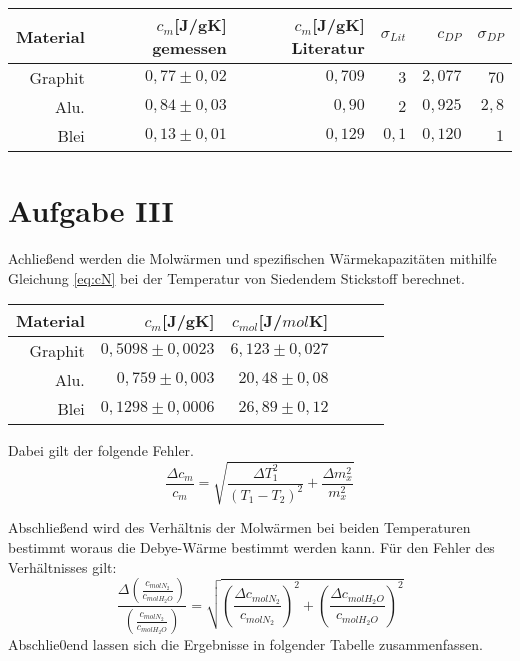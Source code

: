 \begin{table}[h!]
    \centering
    \begin{tabular}{r r r r r r}
        \toprule
        Material & $c_m$[J/gK] gemessen & $c_m$[J/gK] Literatur& $\sigma_{Lit}$ & $c_{DP}$ & $\sigma_{DP}$ \\
        \midrule
        Graphit &  $0,77 \pm 0,02 $ & $0,709$& $3$&$2,077$ &$70$\\
        Alu. & $0,84 \pm 0,03$ &$0,90$&$2$ &$0,925$ &$ 2,8 $\\
        Blei  & $0,13 \pm 0,01$ &$0,129$& $0,1$ &$0,120$&$1$\\
        
    \end{tabular}
\end{table}
\section{Aufgabe III}
Achließend werden die Molwärmen und spezifischen Wärmekapazitäten mithilfe Gleichung \ref{eq:cN} bei der
Temperatur von Siedendem Stickstoff berechnet.

\begin{table}[h!]
    \centering
    \begin{tabular}{r r r r r r}
        \toprule
        Material & $c_m$[J/gK] & $c_{mol}$[J/$mol$K] \\
        \midrule
        Graphit & $ 0,5098 \pm 0,0023 $ & $6,123 \pm 0,027$ \\
        Alu. & $0,759 \pm 0,003 $ & $20,48 \pm 0,08$ \\
        Blei & $0,1298 \pm 0,0006 $ &$ 26,89 \pm 0,12$ \\

    \end{tabular}
\end{table}
Dabei gilt der folgende Fehler.
\begin{equation}
    \frac{\Delta c_m}{c_m}=\sqrt{\frac{\Delta T_{1}^{2}}{\left(T_{1} - T_{2}\right)^{2}} + \frac{\Delta m_{x}^{2}}{m_{x}^{2}}}
\end{equation}

Abschließend wird des Verhältnis der Molwärmen bei beiden Temperaturen bestimmt woraus die Debye-Wärme bestimmt werden kann.
Für den Fehler des Verhältnisses gilt:
\begin{equation}
    \frac{\Delta (\frac{c_{molN_2}}{c_{molH_2O}})}{(\frac{c_{molN_2}}{c_{molH_2O}})} = \sqrt{(\frac{\Delta c_{molN_2}}{c_{molN_2}})^2 + (\frac{\Delta c_{molH_2O}}{c_{molH_2O}})^2}
\end{equation}
Abschlie0end lassen sich die Ergebnisse in folgender Tabelle zusammenfassen.

